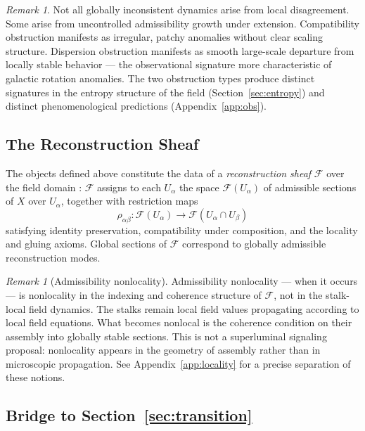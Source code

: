 \documentclass[11pt, a4paper]{article}
\theoremstyle{plain}
\theoremstyle{definition}
\theoremstyle{remark}
\newtheorem{remark}[theorem]{Remark}
\newcommand{\sheaf}{\mathcal{F}}
\begin{document}
\begin{remark}
Not all globally inconsistent dynamics arise from local disagreement. Some arise from
uncontrolled admissibility growth under extension. Compatibility obstruction manifests
as irregular, patchy anomalies without clear scaling structure. Dispersion obstruction
manifests as smooth large-scale departure from locally stable behavior --- the
observational signature more characteristic of galactic rotation anomalies. The two
obstruction types produce distinct signatures in the entropy structure of the field
(Section~\ref{sec:entropy}) and distinct phenomenological predictions
(Appendix~\ref{app:obs}).
\end{remark}

\subsection{The Reconstruction Sheaf}

The objects defined above constitute the data of a \emph{reconstruction sheaf}
$\sheaf$ over the field domain \cite{bredon1997,kashiwara2005}: $\sheaf$ assigns to
each $U_\alpha$ the space $\sheaf(U_\alpha)$ of admissible sections of $X$ over
$U_\alpha$, together with restriction maps
\[
  \rho_{\alpha\beta} \colon \sheaf(U_\alpha) \longrightarrow \sheaf(U_\alpha \cap U_\beta)
\]
satisfying identity preservation, compatibility under composition, and the locality
and gluing axioms. Global sections of $\sheaf$ correspond to globally admissible
reconstruction modes.

\begin{remark}[Admissibility nonlocality]
\label{rem:nonlocal}
Admissibility nonlocality --- when it occurs --- is nonlocality in the indexing and
coherence structure of $\sheaf$, not in the stalk-local field dynamics. The stalks
remain local field values propagating according to local field equations. What becomes
nonlocal is the coherence condition on their assembly into globally stable sections.
This is not a superluminal signaling proposal: nonlocality appears in the geometry of
assembly rather than in microscopic propagation. See Appendix~\ref{app:locality} for
a precise separation of these notions.
\end{remark}

\subsection{Bridge to Section~\ref{sec:transition}}
\end{document}
